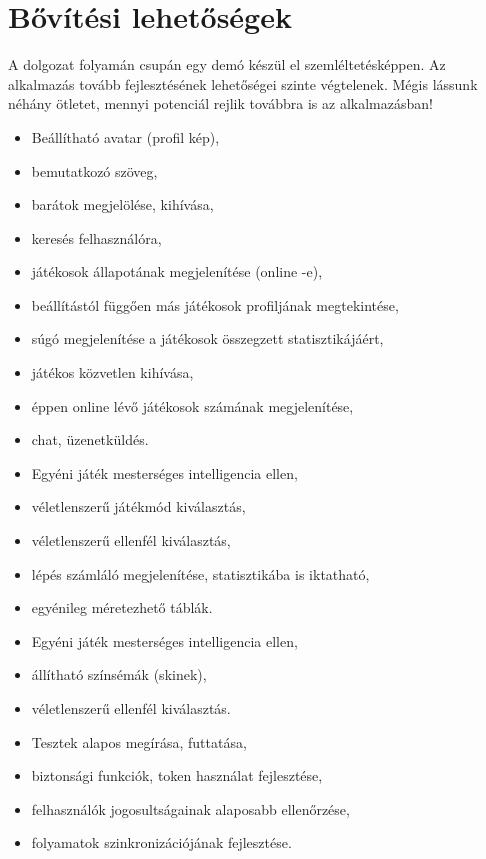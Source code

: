 \chapter{Bővítési lehetőségek}

A dolgozat folyamán csupán egy demó készül el szemléltetésképpen. Az alkalmazás tovább fejlesztésének lehetőségei szinte végtelenek. Mégis lássunk néhány ötletet, mennyi potenciál rejlik továbbra is az alkalmazásban!


\begin{itemize}
	\item Beállítható avatar (profil kép),
	\item bemutatkozó szöveg,
	\item barátok megjelölése, kihívása,
	\item keresés felhasználóra,
	\item játékosok állapotának megjelenítése (online -e),
	\item beállítástól függően más játékosok profiljának megtekintése,
	\item súgó megjelenítése a játékosok összegzett statisztikájáért,
	\item játékos közvetlen kihívása,
	\item éppen online lévő játékosok számának megjelenítése,
	\item chat, üzenetküldés.
\end{itemize}


\begin{itemize}
	\item Egyéni játék mesterséges intelligencia ellen,
	\item véletlenszerű játékmód kiválasztás,
	\item véletlenszerű ellenfél kiválasztás,
	\item lépés számláló megjelenítése, statisztikába is iktatható,
	\item egyénileg méretezhető táblák.
\end{itemize}


\begin{itemize}
	\item Egyéni játék mesterséges intelligencia ellen,
	\item állítható színsémák (skinek),
	\item véletlenszerű ellenfél kiválasztás.
\end{itemize}


\begin{itemize}
	\item Tesztek alapos megírása, futtatása,
	\item biztonsági funkciók, token használat fejlesztése,
	\item felhasználók jogosultságainak alaposabb ellenőrzése,
	\item folyamatok szinkronizációjának fejlesztése.
\end{itemize}